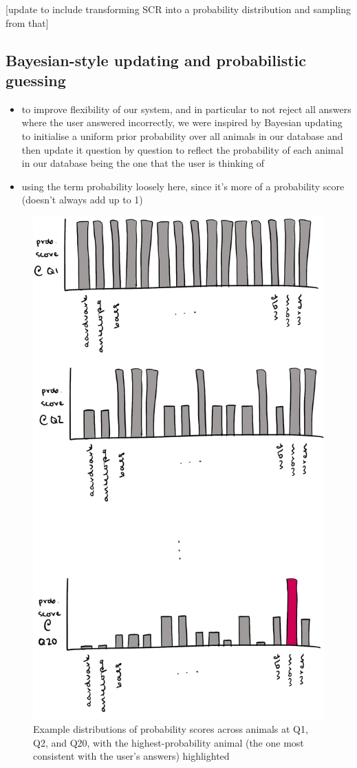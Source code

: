 \documentclass[11pt,a4paper]{article}
\begin{document}
[update to include transforming SCR into a probability distribution and sampling from that]

\subsection{Bayesian-style updating and probabilistic guessing}

\begin{itemize}
	\item to improve flexibility of our system, and in particular to not reject all answers where the user answered incorrectly, we were inspired by Bayesian updating to initialise a uniform prior probability over all animals in our database and then update it question by question to reflect the probability of each animal in our database being the one that the user is thinking of
	\item using the term probability loosely here, since it's more of a probability score (doesn't always add up to 1)
\end{itemize}

\begin{figure}
	\includegraphics[width=.8\linewidth]{Bayesian-updating.png}
	\caption{Example distributions of probability scores across animals at Q1, Q2, and Q20, with the highest-probability animal (the one most consistent with the user's answers) highlighted}
	\label{fig:bayesian-update}
\end{figure}
\end{document}
